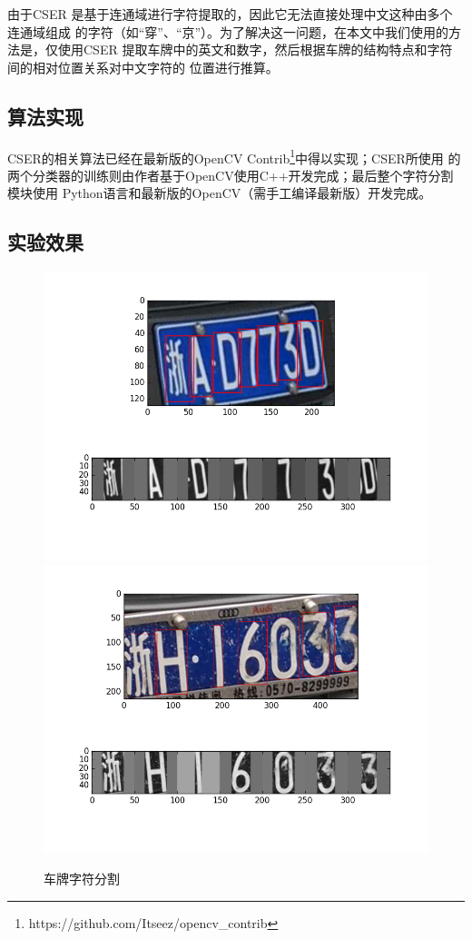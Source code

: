 由于CSER 是基于连通域进行字符提取的，因此它无法直接处理中文这种由多个连通域组成
的字符（如“穿”、“京”）。为了解决这一问题，在本文中我们使用的方法是，仅使用CSER
提取车牌中的英文和数字，然后根据车牌的结构特点和字符间的相对位置关系对中文字符的
位置进行推算。

\subsection{算法实现}

CSER的相关算法已经在最新版的OpenCV
Contrib\footnote{https://github.com/Itseez/opencv\_contrib}中得以实现；CSER所使用
的两个分类器的训练则由作者基于OpenCV使用C++开发完成；最后整个字符分割模块使用
Python语言和最新版的OpenCV（需手工编译最新版）开发完成。

\subsection{实验效果}

\begin{figure}[th]
\centering
{}
{\includegraphics[width=1\linewidth]{./Figure/TextSegmentation.png}}
{\includegraphics[width=1\linewidth]{./Figure/TextSegmentation2.png}}
\caption{车牌字符分割}\label{Fig:TextSeg}
\end{figure}

